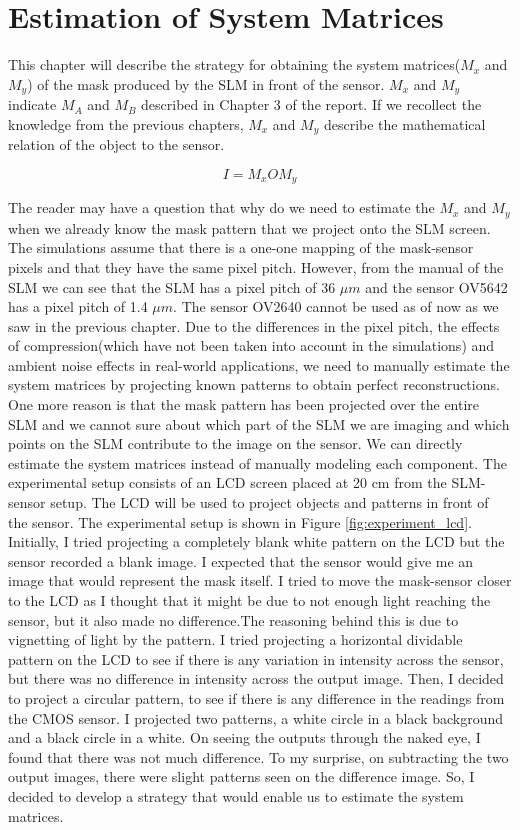 \chapter{Estimation of System Matrices}
This chapter will describe the strategy for obtaining the system matrices($M_x$ and $M_y$) of the mask produced by the SLM in front of the sensor. $M_x$ and $M_y$ indicate $M_A$ and $M_B$ described in Chapter 3 of the report. If we recollect the knowledge from the previous chapters, $M_x$ and $M_y$ describe the mathematical relation of the object to the sensor.

\begin{equation}
I = M_{x}OM_{y}
\label{qe:sm1}
\end{equation}

The reader may have a question that why do we need to estimate the $M_x$ and $M_y$ when we already know the mask pattern that we project onto the SLM screen. The simulations assume that there is a one-one mapping of the mask-sensor pixels and that they have the same pixel pitch. However, from the manual of the SLM\cite{LC2012MAN}  we can see that the SLM has a pixel pitch of 36 $\mu m$ and the sensor OV5642 has a pixel pitch of 1.4 $\mu m$. The sensor OV2640 cannot be used as of now as we saw in the previous chapter. Due to the differences in the pixel pitch, the effects of compression(which have not been taken into account in the simulations) and ambient noise effects in real-world applications, we need to manually estimate the system matrices by projecting known patterns to obtain perfect reconstructions. One more reason is that the mask pattern has been projected over the entire SLM and we cannot sure about which part of the SLM we are imaging and which points on the SLM contribute to the image on the sensor. We can directly estimate the system matrices instead of manually modeling each component.
The experimental setup consists of an LCD screen placed at 20 cm from the SLM-sensor setup. The LCD will be used to project objects and patterns in front of the sensor. The experimental setup is shown in Figure \ref{fig:experiment_lcd}.
Initially, I tried projecting a completely blank white pattern on the LCD but the sensor recorded a blank image. I expected that the sensor would give me an image that would represent the mask itself. I tried to move the mask-sensor closer to the LCD as I thought that it might be due to not enough light reaching the sensor, but it also made no difference.The reasoning behind this is due to vignetting of light by the pattern. I tried projecting a horizontal dividable pattern on the LCD to see if there is any variation in intensity across the sensor, but there was no difference in intensity across the output image. Then, I decided to project a circular pattern, to see if there is any difference in the readings from the CMOS sensor. I projected two patterns, a white circle in a black background and a black circle in a white. On seeing the outputs through the naked eye, I found that there was not much difference. To my surprise, on subtracting the two output images, there were slight patterns seen on the difference image. So, I decided to develop a strategy that would enable us to estimate the system matrices.

